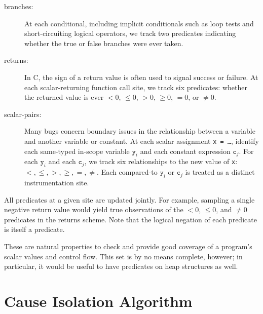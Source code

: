 \documentclass[draft]{sig-alternate}
\begin{document}
\begin{description}
\sloppy
\item[branches:] At each conditional, including implicit conditionals
such as loop tests and short-circuiting logical operators, we track two predicates
indicating whether the true or false branches were ever taken.

\item[returns:] In C, the
  sign of a return value is often used to signal success or failure.
  At each scalar-returning function call site, we track six predicates:
  whether the returned value is ever $< 0$, $\le 0$, $> 0$, $\ge 0$,
  $= 0$, or $\ne 0$.

\item[scalar-pairs:] Many bugs
  concern boundary issues in the relationship between a 
  variable and another variable or constant.  At
  each scalar assignment \texttt{x = \dots}, identify each
  same-typed in-scope variable $\mathtt{y}_i$ and each
  constant expression $\mathtt{c}_j$.  For each   $\mathtt{y}_i$ and each $\mathtt{c}_j$,  
  we track six relationships to the new value of \texttt{x}: $<, \leq, >, \geq, =, \neq$.
Each compared-to $\mathtt{y}_i$
  or $\mathtt{c}_j$ is treated as a distinct instrumentation site.
\end{description}

All predicates at a given site are updated jointly.  For
example, sampling a single negative return value would yield true
observations of the $< 0$, $\le 0$, and $\ne 0$ predicates in the
returns scheme.  Note that the logical negation of each predicate is
itself a predicate.

  These are natural properties to check and provide good coverage of a
  program's scalar values and control flow.  This set is by no means
  complete, however; in particular, it would be useful to have
  predicates on heap structures as well.

\section{Cause Isolation Algorithm}
\label{sec:algorithm}

\end{document}
